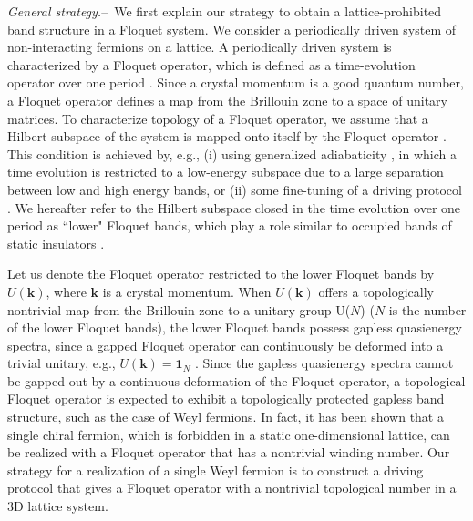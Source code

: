 \documentclass[
floatfix,
pra,
twocolumn,
reprint,
amsmath,amssymb,
aps,
footnote,
]{revtex4}
\begin{document}
\textit{General strategy.}--\
We first explain our strategy to obtain a lattice-prohibited band structure in a Floquet system. We consider a periodically driven system of non-interacting fermions on a lattice. A periodically driven system is characterized by a Floquet operator, which is defined as a time-evolution operator over one period \cite{Eckardt17}. Since a crystal momentum is a good quantum number, a Floquet operator defines a map from the Brillouin zone to a space of unitary matrices. To characterize topology of a Floquet operator, we assume that a Hilbert subspace of the system is mapped onto itself by the Floquet operator \cite{Kitagawa10}. This condition is achieved by, e.g., (i) using generalized adiabaticity \cite{Kitagawa10, SunX18}, in which a time evolution is restricted to a low-energy subspace due to a large separation between low and high energy bands, or (ii) some fine-tuning of a driving protocol \cite{Budich17}. We hereafter refer to the Hilbert subspace closed in the time evolution over one period as ``lower" Floquet bands, which play a role similar to occupied bands of static  insulators \cite{Kitagawa10}.

Let us denote the Floquet operator restricted to the lower Floquet bands by $U(\bm{k})$, where $\bm{k}$ is a crystal momentum. When $U(\bm{k})$ offers a topologically nontrivial map from the Brillouin zone to a unitary group U($N$) ($N$ is the number of the lower Floquet bands), the lower Floquet bands possess gapless quasienergy spectra, since a gapped Floquet operator can continuously be deformed into a trivial unitary, e.g., $U(\bm{k})=\bm{1}_N$ \cite{Kitagawa10, NathanRudner15}. Since the gapless quasienergy spectra cannot be gapped out by a continuous deformation of the Floquet operator, a topological Floquet operator is expected to exhibit a topologically protected gapless band structure, such as the case of Weyl fermions.
In fact, it has been shown \cite{Kitagawa10, 1d_winding} that a single chiral fermion, which is forbidden in a static one-dimensional lattice, can be realized with a Floquet operator that has a nontrivial winding number.
Our strategy for a realization of a single Weyl fermion is to construct a driving protocol that gives a Floquet operator with a nontrivial topological number in a 3D lattice system.
\end{document}
